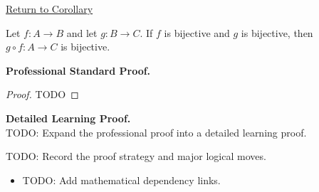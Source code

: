 \newpage
{}
\label{prf:composition-bijective}

\begin{remark*}[Return]
\hyperref[cor:composition-bijective]{Return to Corollary}
\end{remark*}

\begin{corollary*}
Let $f:A\to B$ and let $g:B\to C$. If $f$ is bijective and $g$ is bijective, then $g\circ f:A\to C$ is bijective.
\end{corollary*}

\textbf{Professional Standard Proof.}~\\
\begin{proof}
TODO
\end{proof}

\textbf{Detailed Learning Proof.}~\\
TODO: Expand the professional proof into a detailed learning proof.

\begin{remark*}
TODO: Record the proof strategy and major logical moves.
\end{remark*}

\begin{dependencies}
\begin{itemize}
  \item TODO: Add mathematical dependency links.
\end{itemize}
\end{dependencies}
